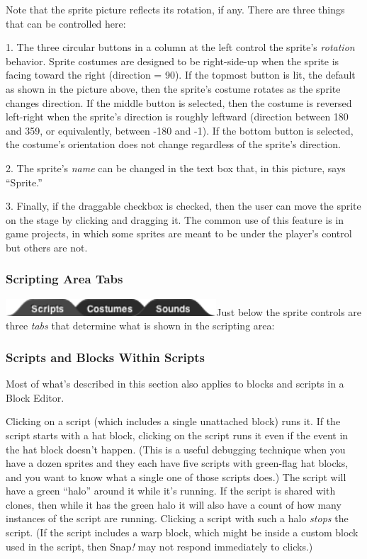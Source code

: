 Note that the sprite picture reflects its rotation, if any. There are
three things that can be controlled here:

1. The three circular buttons in a column at the left control the
sprite's \emph{rotation} behavior. Sprite costumes are designed to be
right-side-up when the sprite is facing toward the right (direction =
90). If the topmost button is lit, the default as shown in the picture
above, then the sprite's costume rotates as the sprite changes
direction. If the middle button is selected, then the costume is
reversed left-right when the sprite's direction is roughly leftward
(direction between 180 and 359, or equivalently, between -180 and -1).
If the bottom button is selected, the costume's orientation does not
change regardless of the sprite's direction.

2. The sprite's \emph{name} can be changed in the text box that, in this
picture, says ``Sprite.''

3. Finally, if the draggable checkbox is checked, then the user can move
the sprite on the stage by clicking and dragging it. The common use of
this feature is in game projects, in which some sprites are meant to be
under the player's control but others are not.

\subsubsection{Scripting Area Tabs}\label{scripting-area-tabs}

\includegraphics[width=3.09722in,height=0.25in]{media/image1065.png}Just
below the sprite controls are three \emph{tabs} that determine what is
shown in the scripting area:

\subsubsection{Scripts and Blocks Within
Scripts}\label{scripts-and-blocks-within-scripts}

Most of what's described in this section also applies to blocks and
scripts in a Block Editor.

Clicking on a script (which includes a single unattached block) runs it.
If the script starts with a hat block, clicking on the script runs it
even if the event in the hat block doesn't happen. (This is a useful
debugging technique when you have a dozen sprites and they each have
five scripts with green-flag hat blocks, and you want to know what a
single one of those scripts does.) The script will have a green ``halo''
around it while it's running. If the script is shared with clones, then
while it has the green halo it will also have a count of how many
instances of the script are running. Clicking a script with such a halo
\emph{stops} the script. (If the script includes a warp block, which
might be inside a custom block used in the script, then Snap\emph{!} may
not respond immediately to clicks.)

